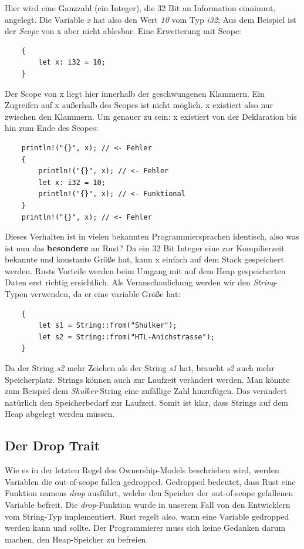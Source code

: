 Hier wird eine Ganzzahl (ein Integer), die 32 Bit an Information einnimmt, angelegt. Die Variable \textit{x} hat also den Wert \textit{10} vom Typ \textit{i32};
Aus dem Beispiel ist der \textit{Scope} von x aber nicht ablesbar. Eine Erweiterung mit Scope:

\begin{lstlisting}
    {
        let x: i32 = 10;
    }
\end{lstlisting}

Der Scope von x liegt hier innerhalb der geschwungenen Klammern. Ein Zugreifen auf x außerhalb des Scopes ist nicht möglich. x existiert also nur
zwischen den Klammern. Um genauer zu sein: x existiert von der Deklaration bis hin zum Ende des Scopes:
\begin{lstlisting}
    println!("{}", x); // <- Fehler
    {
        println!("{}", x); // <- Fehler
        let x: i32 = 10;
        println!("{}", x); // <- Funktional
    }
    println!("{}", x); // <- Fehler
\end{lstlisting}

Dieses Verhalten ist in vielen bekannten Programmiersprachen identisch, also was ist nun das \textbf{besondere} an Rust? Da ein 32 Bit Integer
eine zur Kompilierzeit bekannte und konstante Größe hat, kann x einfach auf dem Stack gespeichert werden. Rusts Vorteile werden beim Umgang mit
auf dem Heap gespeicherten Daten erst richtig ersichtlich. Als Veranschaulichung werden wir den \textit{String}-Typen verwenden, da er eine
variable Größe hat:
\begin{lstlisting}
    {
        let s1 = String::from("Shulker");
        let s2 = String::from("HTL-Anichstrasse");
    }
\end{lstlisting}

Da der String \textit{s2} mehr Zeichen als der String \textit{s1} hat, braucht \textit{s2} auch mehr Speicherplatz. Strings können auch zur Laufzeit
verändert werden. Man könnte zum Beispiel dem \textit{Shulker}-String eine zufällige Zahl hinzufügen. Das verändert natürlich den Speicherbedarf zur
Laufzeit. Somit ist klar, dass Strings auf dem Heap abgelegt werden müssen.

\subsection{Der Drop Trait}
Wie es in der letzten Regel des Ownership-Models beschrieben wird, werden Variablen die out-of-scope fallen gedropped. Gedropped bedeutet, dass Rust
eine Funktion namens \textit{drop} ausführt, welche den Speicher der out-of-scope gefallenen Variable befreit. Die \textit{drop}-Funktion wurde in
unserem Fall von den Entwicklern vom String-Typ implementiert. Rust regelt also, wann eine Variable gedropped werden kann und sollte. Der Programmierer
muss sich keine Gedanken darum machen, den Heap-Speicher zu befreien.

